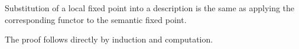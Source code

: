 \begin{lemma}
Substitution of a local fixed point into a description is the same as applying the corresponding functor to the semantic fixed point.
\begin{code}%
%
\>[4]\AgdaSpace{}%
\AgdaSymbol{:}\AgdaSpace{}%
\AgdaSpace{}%
\AgdaSpace{}%
\AgdaSpace{}%
\AgdaSpace{}%
\AgdaSpace{}%
\AgdaSpace{}%
\AgdaSymbol{(}\AgdaSpace{}%
\AgdaSymbol{)}\AgdaSpace{}%
\AgdaSpace{}%
\AgdaSpace{}%
\AgdaSpace{}%
\AgdaSpace{}%
\AgdaSpace{}%
\AgdaSpace{}%
\AgdaSpace{}%
\AgdaSpace{}%
\AgdaSpace{}%
\AgdaSpace{}%
\<%
\end{code}
\end{lemma}
The proof follows directly by induction and computation.
